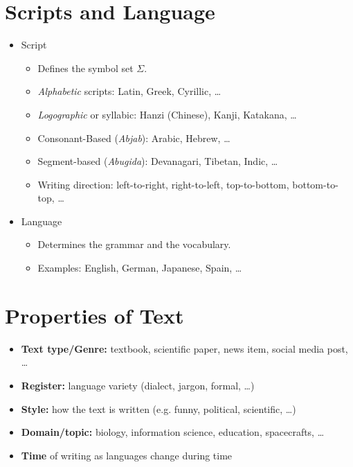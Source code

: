 	\section{Scripts and Language} %
		\begin{itemize}
			\item Script
				\begin{itemize}
					\item Defines the symbol set \( \Sigma \).
					\item \textit{Alphabetic} scripts: Latin, Greek, Cyrillic, \dots
					\item \textit{Logographic} or syllabic: Hanzi (Chinese), Kanji, Katakana, \dots
					\item Consonant-Based (\textit{Abjab}): Arabic, Hebrew, \dots
					\item Segment-based (\textit{Abugida}): Devanagari, Tibetan, Indic, \dots
					\item Writing direction: left-to-right, right-to-left, top-to-bottom, bottom-to-top, \dots
				\end{itemize}
			\item Language
				\begin{itemize}
					\item Determines the grammar and the vocabulary.
					\item Examples: English, German, Japanese, Spain, \dots
				\end{itemize}
		\end{itemize}

	\section{Properties of Text} %
		\begin{itemize}
			\item \textbf{Text type/Genre:} textbook, scientific paper, news item, social media post, \dots
			\item \textbf{Register:} language variety (dialect, jargon, formal, \dots)
			\item \textbf{Style:} how the text is written (e.g. funny, political, scientific, \dots)
			\item \textbf{Domain/topic:} biology, information science, education, spacecrafts, \dots
			\item \textbf{Time} of writing as languages change during time
		\end{itemize}

